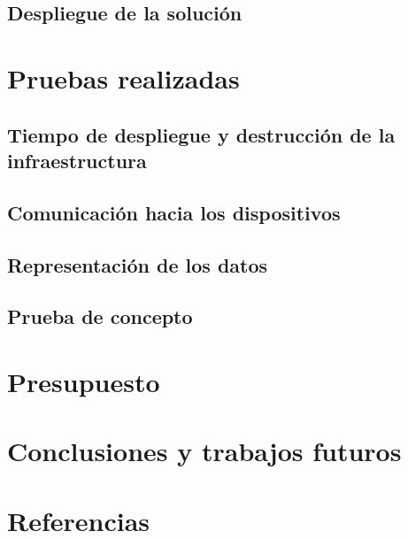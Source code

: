 \documentclass[12pt]{article}
\begin{document}
\subsection{Despliegue de la solución}


\section{Pruebas realizadas}


\subsection{Tiempo de despliegue y destrucción de la infraestructura}


\subsection{Comunicación hacia los dispositivos}


\subsection{Representación de los datos}


\subsection{Prueba de concepto}



\section{Presupuesto}


\section{Conclusiones y trabajos futuros}


\newpage
\setcounter{secnumdepth}{0}
\section{Referencias}
\printbibliography[heading=none]
\end{document}
